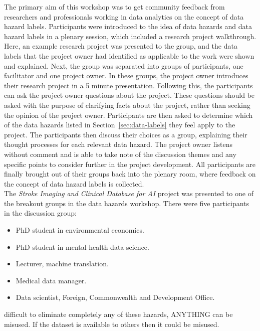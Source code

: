 \documentclass{article}
\begin{document}
The primary aim of this workshop was to get community feedback from
researchers and professionals working in data analytics on the concept
of data hazard labels.
Participants were introduced to the idea of data hazards and data
hazard labels in a plenary session, which included a research project
walkthrough. Here, an example research project was presented to the
group, and the data labels that the project owner had identified as
applicable to the work were shown and explained.
Next, the group was separated into groups of participants, one
facilitator and one project owner.
In these groups, the project owner introduces their research project
in a 5 minute presentation. Following this, the participants can ask
the project owner questions about the project. These questions should
be asked with the purpose of clarifying facts about the project,
rather than seeking the opinion of the project owner.
Participants are then asked to determine which of the data hazards
listed in Section~\ref{sec:data-labels} they feel apply to the
project. The participants then discuss their choices as a group,
explaining their thought processes for each relevant data hazard.
The project owner listens without comment and is able to take note of
the discussion themes and any specific points to consider further in
the project development. All participants are finally brought out of
their groups back into the plenary room, where feedback on the concept
of data hazard labels is collected. \\

The \textit{Stroke Imaging and Clinical Database for AI} project was
presented to one of the breakout groups in the data hazards workshop.
There were five participants in the discussion group:

\begin{itemize}
\item PhD student in environmental economics.
\item PhD student in mental health data science.
\item Lecturer, machine translation.
\item Medical data manager.
\item Data scientist, Foreign, Commonwealth and Development Office.
\end{itemize}




 difficult to eliminate completely any of these hazards, ANYTHING
  can be misused. If the dataset is available to others then it could
  be misused.
\end{document}
